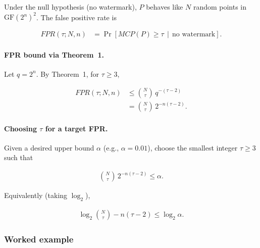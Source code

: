 \documentclass[a4paper,11pt]{llncs}
\newcommand{\GF}{\mathrm{GF}}
\begin{document}
Under the null hypothesis (no watermark), $P$ behaves like $N$ random points in $\GF(2^n)^2$. The false positive rate is

\begin{equation}
\label{eq:fpr-def}
\begin{aligned}
    FPR(\tau;N,n)
    &= \Pr\!\left[MCP(P)\ge \tau \,\middle|\, \text{no watermark}\right].
\end{aligned}
\end{equation}

\paragraph{FPR bound via Theorem~1.}

Let $q=2^n$. By Theorem~1, for $\tau\ge 3$,

\begin{equation}
\label{eq:fpr-bound}
\begin{aligned}
    FPR(\tau;N,n)
    &\le \binom{N}{\tau}\, q^{-(\tau-2)} \\
    &= \binom{N}{\tau}\, 2^{-n(\tau-2)} .
\end{aligned}
\end{equation}

\paragraph{Choosing $\tau$ for a target FPR.}

Given a desired upper bound $\alpha$ (e.g., $\alpha=0.01$), choose the smallest
integer $\tau\ge 3$ such that

\begin{equation}
\label{eq:tau-choice}
\begin{aligned}
    \binom{N}{\tau}\, 2^{-n(\tau-2)} \le \alpha .
\end{aligned}
\end{equation}

Equivalently (taking $\log_2$),

\begin{equation}
\label{eq:tau-choice-log}
\begin{aligned}
    \log_2 \binom{N}{\tau} - n(\tau-2) \le \log_2 \alpha .
\end{aligned}
\end{equation}


\subsubsection{Worked example}
\end{document}
